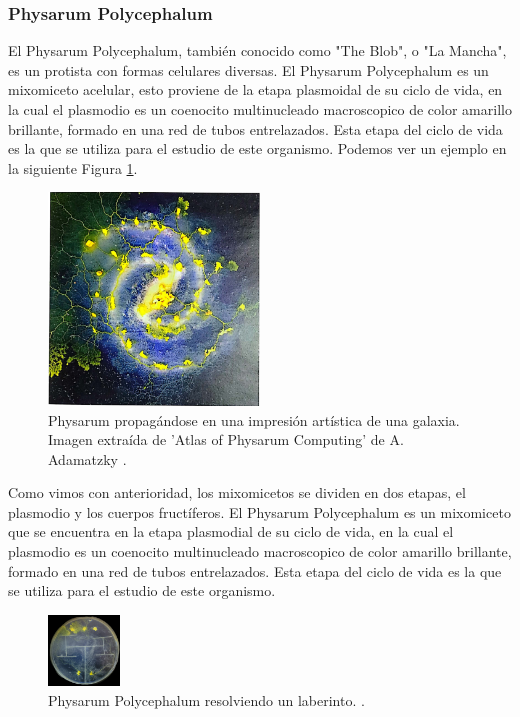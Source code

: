 \subsubsection{Physarum Polycephalum}
\label{ssub:PhysarumPolycephalum01}
    El Physarum Polycephalum, tambi\'en conocido como "The Blob", 
        o "La Mancha", es un protista con formas celulares diversas. El Physarum Polycephalum
        es un mixomiceto acelular, esto proviene de la etapa plasmoidal de su ciclo de vida,
        en la cual el plasmodio es un coenocito multinucleado macroscopico de color amarillo 
        brillante, formado en una red de tubos entrelazados. Esta etapa del ciclo de vida es 
        la que se utiliza para el estudio de este organismo.\cite{Dee1960} Podemos ver un ejemplo
        en la siguiente Figura \ref{fig:PhysarumPolycephalum01}.
    \begin{figure}[h]  
        \centering
        \includegraphics[width=0.5\textwidth]{./images/marco_teorico/Physarum/PhyrasumPolycephalum01.png}
        \caption{Physarum propag\'andose en una impresi\'on art\'istica de una galaxia. Imagen extra\'ida de 'Atlas of Physarum Computing' de A. Adamatzky \cite{Adamatzky2014}.}
        \label{fig:PhysarumPolycephalum01}
    \end{figure} 
    \vskip 0.5cm
    Como vimos con anterioridad, los mixomicetos se dividen en dos etapas, el plasmodio y los cuerpos fruct\'iferos.
        El Physarum Polycephalum es un mixomiceto que se encuentra en la etapa plasmodial de su ciclo de vida, 
        en la cual el plasmodio es un coenocito multinucleado macroscopico de color amarillo brillante, formado en una red de tubos entrelazados.
        Esta etapa del ciclo de vida es la que se utiliza para el estudio de este organismo.\cite{Dee1960}
    \begin{figure}
        \centering
        \includegraphics[width=0.17\textwidth]{./images/marco_teorico/Physarum/LaberintoPhysarum.png}
        \caption{Physarum Polycephalum resolviendo un laberinto. \cite{Adamatzky2014}.}
        \label{fig:PhysarumPolycephalum02}
    \end{figure}
